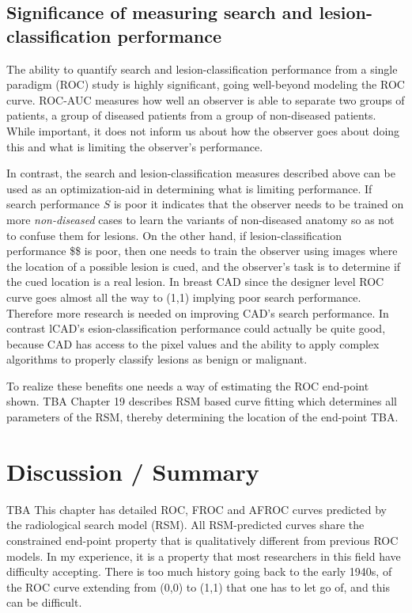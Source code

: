 \documentclass[
]{book}
\begin{document}
\hypertarget{rsm-sc-search-classification-significance}{%
\subsection{Significance of measuring search and lesion-classification performance}\label{rsm-sc-search-classification-significance}}

The ability to quantify search and lesion-classification performance from a single paradigm (ROC) study is highly significant, going well-beyond modeling the ROC curve. ROC-AUC measures how well an observer is able to separate two groups of patients, a group of diseased patients from a group of non-diseased patients. While important, it does not inform us about how the observer goes about doing this and what is limiting the observer's performance.

In contrast, the search and lesion-classification measures described above can be used as an optimization-aid in determining what is limiting performance. If search performance \(S\) is poor it indicates that the observer needs to be trained on more \emph{non-diseased} cases to learn the variants of non-diseased anatomy so as not to confuse them for lesions. On the other hand, if lesion-classification performance \$\$ is poor, then one needs to train the observer using images where the location of a possible lesion is cued, and the observer's task is to determine if the cued location is a real lesion. In breast CAD since the designer level ROC curve goes almost all the way to (1,1) implying poor search performance. Therefore more research is needed on improving CAD's search performance. In contrast lCAD's esion-classification performance could actually be quite good, because CAD has access to the pixel values and the ability to apply complex algorithms to properly classify lesions as benign or malignant.

To realize these benefits one needs a way of estimating the ROC end-point shown. TBA Chapter 19 describes RSM based curve fitting which determines all parameters of the RSM, thereby determining the location of the end-point TBA.

\hypertarget{rsm-sc-discussion-summary}{%
\section{Discussion / Summary}\label{rsm-sc-discussion-summary}}

TBA This chapter has detailed ROC, FROC and AFROC curves predicted by the radiological search model (RSM). All RSM-predicted curves share the constrained end-point property that is qualitatively different from previous ROC models. In my experience, it is a property that most researchers in this field have difficulty accepting. There is too much history going back to the early 1940s, of the ROC curve extending from (0,0) to (1,1) that one has to let go of, and this can be difficult.
\end{document}
